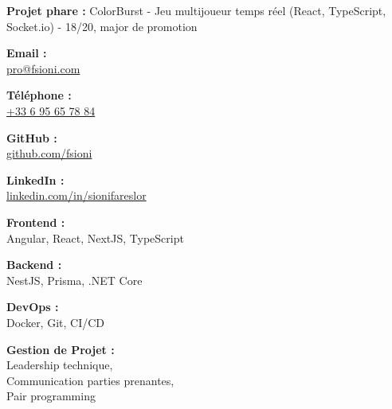 \documentclass[a4paper,11pt]{article}
\begin{document}
\begin{cv}[profile][2]
\begin{cvevent}[2019][2023]
    \textbf{Projet phare :} ColorBurst - Jeu multijoueur temps réel (React, TypeScript, Socket.io) - 18/20, major de promotion
\end{cvevent}

\cvsidebar

\begin{cvitem}[Envelope][4]
    \textbf{Email :}\\
    \href{mailto:pro@fsioni.com}{pro@fsioni.com}
\end{cvitem}

\cvseparator[3]
\begin{cvitem}[Phone][4]
    \textbf{ Téléphone :}\\
    \href{tel:+33695657884}
    {+33 6 95 65 78 84}
\end{cvitem}

\cvseparator[3]
\begin{cvitem}[Globe][4]
    \textbf{ GitHub :}\\
    \href{https://github.com/fsioni}{github.com/fsioni}
\end{cvitem}

\cvseparator[3]
\begin{cvitem}[Globe][4]
    \textbf{ LinkedIn :}\\
    \href{https://linkedin.com/in/sionifareslor}{linkedin.com/in/sionifareslor}
\end{cvitem}

\begin{cvitem}
    \textbf{ Frontend :} \\
    Angular, React, NextJS, TypeScript
\end{cvitem}

\cvseparator[2]
\begin{cvitem}
    \textbf{Backend :} \\
    NestJS, Prisma, .NET Core
\end{cvitem}

\cvseparator[2]
\begin{cvitem}
    \textbf{DevOps :} \\
    Docker, Git, CI/CD
\end{cvitem}

\cvseparator[2]
\begin{cvitem}
    \textbf{Gestion de Projet :} \\
    Leadership technique, \\
    Communication parties prenantes, \\
    Pair programming
\end{cvitem}


\end{cv}
\end{document}
